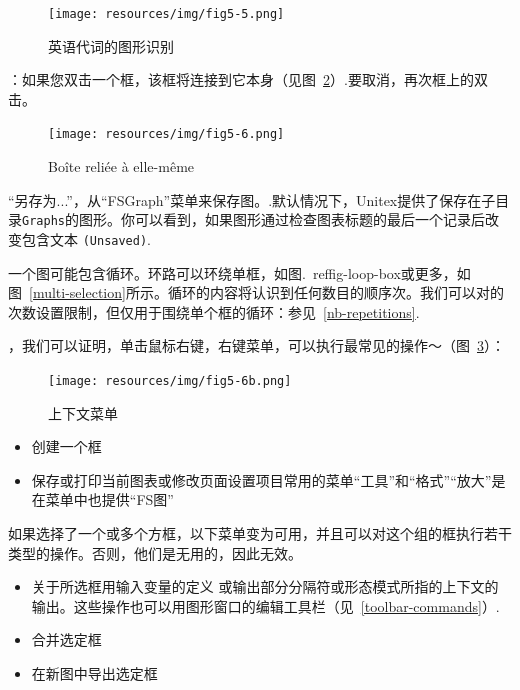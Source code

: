 \begin{figure}[!ht]
\begin{center}
\texttt{[image: resources/img/fig5-5.png]}
\caption{英语代词的图形识别\label{fig-pronoun-graph}}
\end{center}
\end{figure}

\bigskip
{}：如果您双击一个框，该框将连接到它本身（见图~\ref{fig-loop-box}）.要取消，再次框上的双击。
\bigskip
\begin{figure}[!h]
\begin{center}
\texttt{[image: resources/img/fig5-6.png]}
\caption{Boîte reliée à elle-même\label{fig-loop-box}}
\end{center}
\end{figure}

“另存为...”，从“FSGraph”菜单来保存图。.默认情况下，Unitex提供了保存在子目录\verb+Graphs+的图形。你可以看到，如果图形通过检查图表标题的最后一个记录后改变包含文本 \verb+(Unsaved)+.

\bigskip
\noindent  一个图可能包含循环。环路可以环绕单框，如图.~ref{fig-loop-box}或更多，如图~\ref{multi-selection}所示。循环的内容将认识到任何数目的顺序次。我们可以对的次数设置限制，但仅用于围绕单个框的循环：参见~\ref{nb-repetitions}.

\bigskip
{}，我们可以证明，单击鼠标右键，右键菜单，可以执行最常见的操作〜（图~\ref{contextual-menu}）：

\bigskip
\begin{figure}[!h]
\begin{center}
\texttt{[image: resources/img/fig5-6b.png]}
\caption{上下文菜单\label{contextual-menu}}
\end{center}
\end{figure}

\begin{itemize}
\item 创建一个框
\item 保存或打印当前图表或修改页面设置项目常用的菜单“工具”和“格式”“放大”是在菜单中也提供“FS图”\end{itemize}
如果选择了一个或多个方框，以下菜单变为可用，并且可以对这个组的框执行若干类型的操作。否则，他们是无用的，因此无效。\begin{itemize}
\item 关于所选框用输入变量的定义 
或输出部分分隔符或形态模式所指的上下文的输出。这些操作也可以用图形窗口的编辑工具栏（见~\ref{toolbar-commands}）. 
\item 合并选定框
\item 在新图中导出选定框
\end{itemize}


